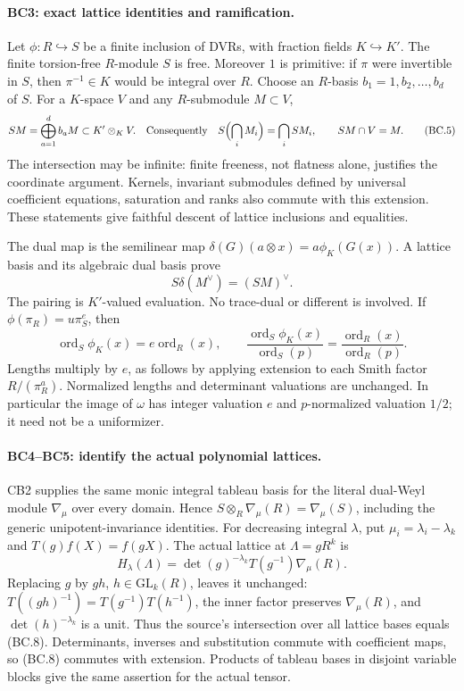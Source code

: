\paragraph{BC3: exact lattice identities and ramification.}
Let $\phi:R\hookrightarrow S$ be a finite inclusion of DVRs, with
fraction fields $K\hookrightarrow K'$. The finite torsion-free
$R$-module $S$ is free. Moreover $1$ is primitive: if $\pi$ were
invertible in $S$, then $\pi^{-1}\in K$ would be integral over $R$.
Choose an $R$-basis $b_1=1,b_2,\ldots,b_d$ of $S$. For a
$K$-space $V$ and any $R$-submodule $M\subset V$,
\[
 SM=\bigoplus_{a=1}^d b_aM\subset K'\otimes_KV.
 \quad\text{Consequently}\quad
 S\Bigl(\bigcap_iM_i\Bigr)=\bigcap_iSM_i,
 \qquad SM\cap V=M.                                     \tag{BC.5}
\]
The intersection may be infinite: finite freeness, not flatness alone,
justifies the coordinate argument. Kernels, invariant submodules defined
by universal coefficient equations, saturation and ranks also commute
with this extension. These statements give faithful descent of lattice
inclusions and equalities.

The dual map is the semilinear map
$\delta(G)(a\otimes x)=a\phi_K(G(x))$. A lattice basis and its
algebraic dual basis prove
\[
 S\delta(M^\vee)=(SM)^\vee.                              \tag{BC.6}
\]
The pairing is $K'$-valued evaluation. No trace-dual or different is
involved. If $\phi(\pi_R)=u\pi_S^e$, then
\[
 \operatorname{ord}_S\phi_K(x)=e\operatorname{ord}_R(x),
 \qquad
 \frac{\operatorname{ord}_S\phi_K(x)}{\operatorname{ord}_S(p)}
 =\frac{\operatorname{ord}_R(x)}{\operatorname{ord}_R(p)}.
                                                               \tag{BC.7}
\]
Lengths multiply by $e$, as follows by applying extension to each
Smith factor $R/(\pi_R^a)$. Normalized lengths and determinant
valuations are unchanged. In particular the image of $\omega$ has
integer valuation $e$ and $p$-normalized valuation $1/2$; it need
not be a uniformizer.

\paragraph{BC4--BC5: identify the actual polynomial lattices.}
CB2 supplies the same monic integral tableau basis for the literal
dual-Weyl module $\nabla_\mu$ over every domain. Hence
$S\otimes_R\nabla_\mu(R)=\nabla_\mu(S)$, including the generic
unipotent-invariance identities. For decreasing integral $\lambda$,
put $\mu_i=\lambda_i-\lambda_k$ and $T(g)f(X)=f(gX)$. The actual
lattice at $\Lambda=gR^k$ is
\[
 H_\lambda(\Lambda)
 =\det(g)^{-\lambda_k}T(g^{-1})\nabla_\mu(R).             \tag{BC.8}
\]
Replacing $g$ by $gh$, $h\in\mathrm{GL}_k(R)$, leaves it unchanged:
$T((gh)^{-1})=T(g^{-1})T(h^{-1})$, the inner factor preserves
$\nabla_\mu(R)$, and $\det(h)^{-\lambda_k}$ is a unit.
Thus the source's intersection over all lattice bases equals
(BC.8). Determinants, inverses and substitution commute with coefficient
maps, so (BC.8) commutes with extension. Products of tableau bases in
disjoint variable blocks give the same assertion for the actual tensor.

